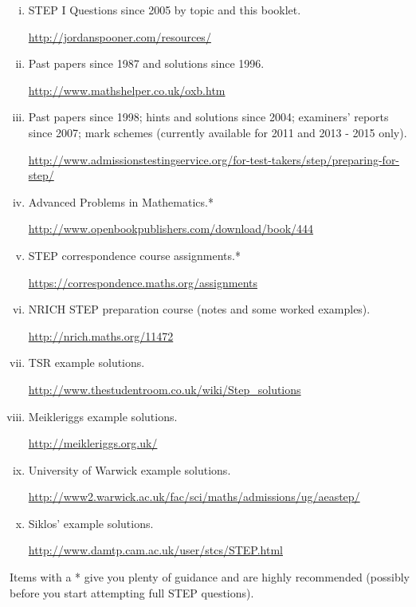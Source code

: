 \documentclass[9pt]{extarticle}
\begin{document}
	\begin{enumerate}[(i)]
		\item STEP I Questions since 2005 by topic and this booklet.
		
		\url{http://jordanspooner.com/resources/}
		
		\item Past papers since 1987 and solutions since 1996.
		
		\url{http://www.mathshelper.co.uk/oxb.htm}
		
		\item Past papers since 1998; hints and solutions since 2004; examiners' reports since 2007; mark schemes (currently available for 2011 and 2013 - 2015 only).
		
		\url{http://www.admissionstestingservice.org/for-test-takers/step/preparing-for-step/}
		
		\item Advanced Problems in Mathematics.*
		
		\url{http://www.openbookpublishers.com/download/book/444}
		
		\item STEP correspondence course assignments.*
		
		\url{https://correspondence.maths.org/assignments}
		
		\item NRICH STEP preparation course (notes and some worked examples).
		
		\url{http://nrich.maths.org/11472}
		
		\item TSR example solutions.
		
		\url{http://www.thestudentroom.co.uk/wiki/Step_solutions}
		
		\item Meikleriggs example solutions.
		
		\url{http://meikleriggs.org.uk/}
		
		\item University of Warwick example solutions.
		
		\url{http://www2.warwick.ac.uk/fac/sci/maths/admissions/ug/aeastep/}
		
		\item Siklos' example solutions.
		
		\url{http://www.damtp.cam.ac.uk/user/stcs/STEP.html}
	\end{enumerate}
	
	\noindent Items with a * give you plenty of guidance and are highly recommended (possibly before you start attempting full STEP questions).
	
\end{document}
